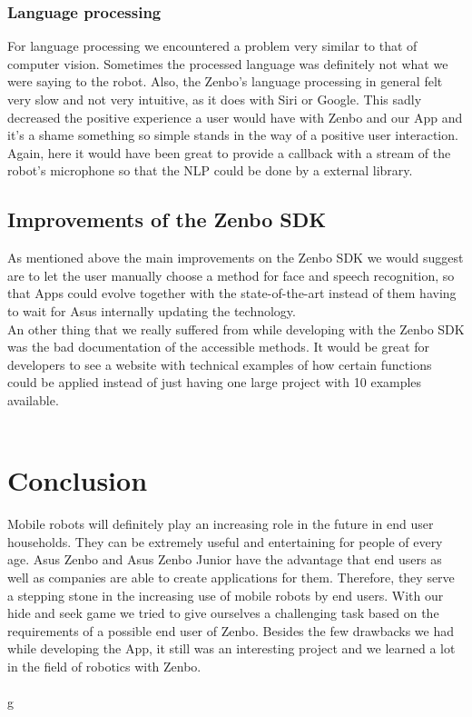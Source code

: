 \documentclass[conference]{IEEEtran}
\begin{document}
\subsubsection{Language processing}
For language processing we encountered a problem very similar to that of computer vision. Sometimes the processed language was definitely not 
what we were saying to the robot. Also, the Zenbo's language processing in general felt very slow and not very intuitive, as it does with Siri or Google.
This sadly decreased the positive experience a user would have with Zenbo and our App and it's a shame something so simple stands in the way of a positive user interaction.
Again, here it would have been great to provide a callback with a stream of the robot's microphone so that the NLP could be done by a external library.

\subsection{Improvements of the Zenbo SDK}
As mentioned above the main improvements on the Zenbo SDK we would suggest are to let the user manually choose a method for face and speech recognition, so that Apps could evolve together with the state-of-the-art instead of them having to wait for Asus internally updating the technology.\\
An other thing that we really suffered from while developing with the Zenbo SDK was the bad documentation of the accessible methods.
It would be great for developers to see a website with technical examples of how certain functions could be applied instead of just having one large project with 10 examples available.\\\\
\section{Conclusion}
Mobile robots will definitely play an increasing role in the future in end user households. 
They can be extremely useful and entertaining for people of every age. Asus Zenbo and Asus Zenbo Junior
have the advantage that end users as well as companies are able to create applications for them.
Therefore, they serve a stepping stone in the increasing use of mobile robots by end users.
With our hide and seek game we tried to give ourselves a challenging task based on the requirements of a possible end user of Zenbo.
Besides the few drawbacks we had while developing the App, it still was an interesting project and we learned a lot in the field of robotics
with Zenbo.\\\\ 
g
\end{document}
